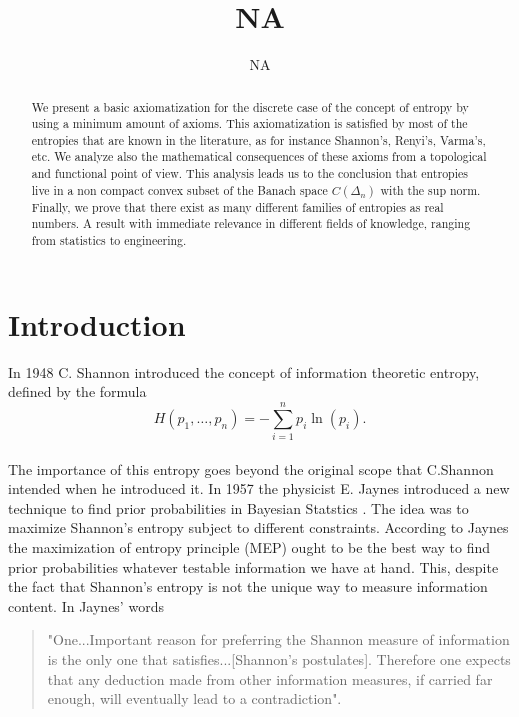 \documentclass[11pt]{article}
\title{NA}
\author{NA}
\theoremstyle{plain}
\begin{document}
\begin{abstract}
We present a basic axiomatization for the discrete case of the
concept of entropy by using a minimum amount of axioms. This
axiomatization is satisfied by most of the entropies that are
known in the literature, as for instance Shannon's, Renyi's,
Varma's, etc. We analyze also the mathematical consequences of
these axioms from a topological and functional point of view. This
analysis leads us to the conclusion that entropies live in a non
compact convex subset of the Banach space $C(\Delta_{n})$ with the sup norm.
Finally, we prove that there exist as many different families of
entropies as real numbers. A result with immediate relevance in different fields of knowledge, ranging from statistics to engineering.

\end{abstract}


\section{Introduction}
In 1948 C. Shannon \cite{Shannon} introduced the concept of
information theoretic entropy, defined by the formula
\begin{equation}
H(p_{1},\ldots,p_{n})=-\sum_{i=1}^{n} p_{i}\ln(p_{i}).
\end{equation}
\\
The importance of this entropy goes beyond the original scope that
C.Shannon intended when he introduced it. In 1957 the physicist E.
Jaynes introduced a new technique to find prior probabilities in
Bayesian Statstics \cite{Jaynesfull, Gregory, sivia}. The idea was
to maximize Shannon's entropy subject to different constraints.
According to Jaynes the maximization of entropy principle
(MEP) ought to be the best way to find prior probabilities whatever
testable information we have at hand. This, despite the fact that
Shannon's entropy is not the unique way to measure information
content. In Jaynes' words \cite{Jaynes3, Inadequacy}
\begin{quotation}
"One...Important reason for preferring the  Shannon measure of
information is the only one that satisfies...[Shannon's
postulates]. Therefore one expects that any deduction made from
other information measures, if carried far enough, will eventually
lead to a contradiction".
\end{quotation}
\end{document}
